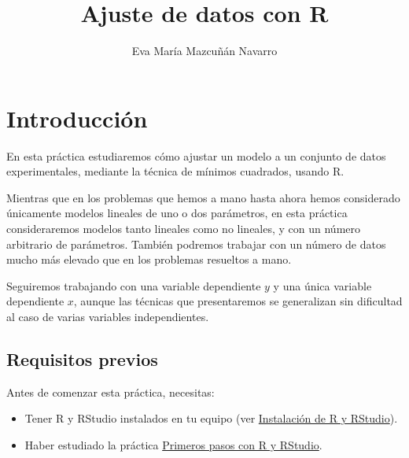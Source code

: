 \documentclass[
  title=normal,
  notoc,
  bib=normal]{mnye}
\title{Ajuste de datos con R}
\author{Eva María Mazcuñán Navarro}
\date{}
\begin{document}
\maketitle

%

{
\hypersetup{linkcolor=etoccolor}
\setcounter{tocdepth}{2}
\tableofcontents
}
\hypertarget{section}{%
\section*{}\label{section}}

\hypertarget{intro}{%
\section*{Introducción}\label{intro}}

En esta práctica estudiaremos cómo ajustar un modelo a un conjunto de datos experimentales, mediante la técnica de mínimos cuadrados, usando \textsf{R}.

Mientras que en los problemas que hemos a mano hasta ahora hemos considerado únicamente modelos lineales de uno o dos parámetros, en esta práctica consideraremos modelos tanto lineales como no lineales, y con un número arbitrario de parámetros. También podremos trabajar con un número de datos mucho más elevado que en los problemas resueltos a mano.

Seguiremos trabajando con una variable dependiente \(y\) y una única variable dependiente \(x\), aunque las técnicas que presentaremos se generalizan sin dificultad al caso de varias variables independientes.

\hypertarget{prerequisites}{%
\subsection*{Requisitos previos}\label{prerequisites}}

Antes de comenzar esta práctica, necesitas:

\begin{itemize}
\item
  Tener \textsf{R} y \textsf{RStudio} instalados en tu equipo (ver \href{https://emazcunan.github.io/install-r-rstudio/}{Instalación de R y RStudio}).
\item
  Haber estudiado la práctica \href{https://emazcunan.github.io/basics-r-rstudio/}{Primeros pasos con R y RStudio}.
\end{itemize}
\end{document}

